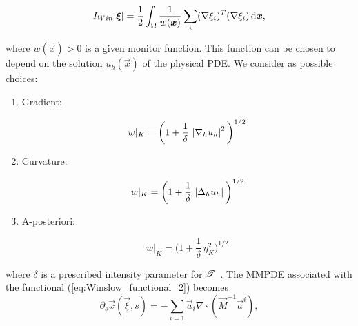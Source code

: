\documentclass[a4paper,11pt]{article}
\begin{document}
{\begin{equation}
    I_{Win}[\boldsymbol \xi] = \frac{1}{2} \int_{\Omega} \frac{1}{ w(\boldsymbol x)} \sum_{i} (\nabla \xi_{i})^{T} (\nabla \xi_{i}) \,\mathrm{d} \boldsymbol x,
\label{eq:Winslow_functional_2}
\end{equation}

where $w(\vec{x}) > 0$ is a given monitor function. This function can be chosen to depend on the solution $u_{h}(\vec{x})$ of the physical PDE. We consider as possible choices:

\begin{enumerate}
    \item Gradient:
    
    \begin{equation}
          w|_{K} = \bigg( 1 + \frac{1}{\delta} \, \left|\nabla_{h} u_{h}\right|^{2} \bigg)^{1/2}
    \label{eq:monitor_gradient}
    \end{equation}
    
    
    \item Curvature:
    
    \begin{equation}
        w|_{K} = \bigg( 1 +  \frac{1}{\delta} \,\left|\Delta_{h}u_{h}\right|\bigg)^{1/2}
    \label{eq:monitor_curvature}
    \end{equation}
    
    \item A-posteriori:  
    
    \begin{equation}
        w|_{K} = \bigg( 1 +  \frac{1}{\delta} \, \eta^{2}_{K}\bigg)^{1/2}
    \label{eq:monitor_posteriori}
    \end{equation}

\end{enumerate}


where $\delta$ is a prescribed intensity parameter for $\mathscr T^{}$
\cite{HR:2011,BHR:2009}. The MMPDE associated with the functional (\ref{eq:Winslow_functional_2})
becomes
\begin{equation}
  \partial_s \vec{x} (\vec \xi ,s)
  =
  - \sum_{i=1} \vec{a}_{i} \nabla \cdot (\vec M^{-1}\vec{a}^{i}),
\label{eq:MMPDE_Winslow}
\end{equation}

}
\end{document}
